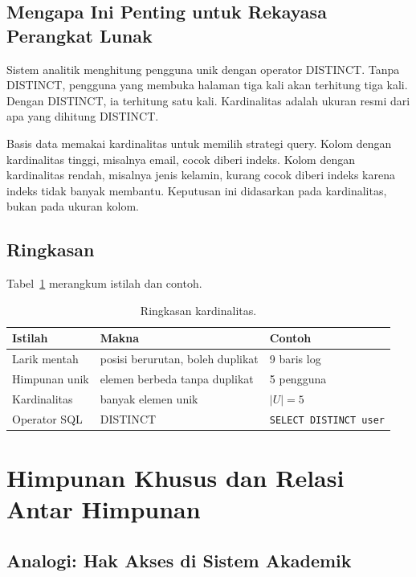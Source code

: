 \documentclass[11pt,a4paper]{article}
\begin{document}
\subsection{Mengapa Ini Penting untuk Rekayasa Perangkat Lunak}

Sistem analitik menghitung pengguna unik dengan operator DISTINCT. Tanpa DISTINCT, pengguna yang membuka halaman tiga kali akan terhitung tiga kali. Dengan DISTINCT, ia terhitung satu kali. Kardinalitas adalah ukuran resmi dari apa yang dihitung DISTINCT.

Basis data memakai kardinalitas untuk memilih strategi query. Kolom dengan kardinalitas tinggi, misalnya email, cocok diberi indeks. Kolom dengan kardinalitas rendah, misalnya jenis kelamin, kurang cocok diberi indeks karena indeks tidak banyak membantu. Keputusan ini didasarkan pada kardinalitas, bukan pada ukuran kolom.

\subsection{Ringkasan}

Tabel~\ref{tab:kardinalitas} merangkum istilah dan contoh.

\begin{table}[H]
	\centering
	\caption{Ringkasan kardinalitas.}
	\label{tab:kardinalitas}
	\small
	\begin{tabularx}{\textwidth}{l X X}
		\toprule
		Istilah & Makna & Contoh \\
		\midrule
		Larik mentah & posisi berurutan, boleh duplikat & 9 baris log \\
		Himpunan unik & elemen berbeda tanpa duplikat & 5 pengguna \\
		Kardinalitas & banyak elemen unik & $|U|=5$ \\
		Operator SQL & DISTINCT & \texttt{SELECT DISTINCT user} \\
		\bottomrule
	\end{tabularx}
\end{table}

\section{Himpunan Khusus dan Relasi Antar Himpunan}

\subsection{Analogi: Hak Akses di Sistem Akademik}
\end{document}
